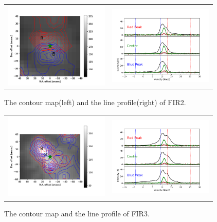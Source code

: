 \documentclass[twoside,11pt]{gshs_thesis}
\begin{document}
\begin{figure}[h!]
	\begin{center}
		\begin{tabular}{cc}
			\includegraphics[width=5cm]{Orion_12CO2-1_FIR2_rbcontour_400_modified.png} &   \includegraphics[width=5cm]{Orion_12CO2-1_FIR2_line_profile_400.png} \\
		\end{tabular}
		\label{FIR221}
		\caption{The contour map(left) and the line profile(right) of FIR2. }
	\end{center}
\end{figure}

\begin{figure}[h!]
	\begin{center}
		\begin{tabular}{cc}
			\includegraphics[width=5cm]{Orion_12CO2-1_FIR3_rbcontour_400_modified.png} &   \includegraphics[width=5cm]{Orion_12CO2-1_FIR3_line_profile_400.png}\\
		\end{tabular}
		\label{FIR321}
		\caption{The contour map and the line profile of FIR3. }
	\end{center}
\end{figure}
\end{document}
